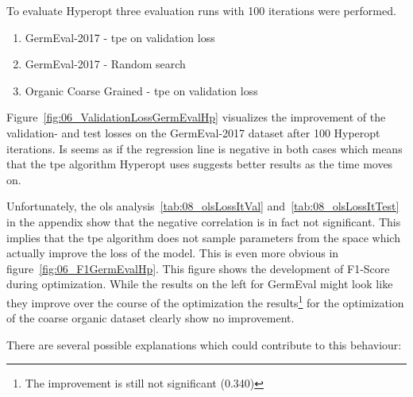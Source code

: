 To evaluate Hyperopt three evaluation runs with 100 iterations were performed.

\begin{enumerate}
	\item GermEval-2017 - \gls{tpe} on validation loss
	\item GermEval-2017 - Random search
	\item Organic Coarse Grained - \gls{tpe} on validation loss
\end{enumerate}

Figure~\ref{fig:06_ValidationLossGermEvalHp} visualizes the improvement of the validation- and test losses on the GermEval-2017 dataset after 100 Hyperopt iterations. Is seems as if the regression line is negative in both cases which means that the \gls{tpe} algorithm Hyperopt uses suggests better results as the time moves on.

Unfortunately, the \gls{ols} analysis~\ref{tab:08_olsLossItVal} and~\ref{tab:08_olsLossItTest} in the appendix show that the negative correlation is in fact not significant. This implies that the \gls{tpe} algorithm does not sample parameters from the space which actually improve the loss of the model. This is even more obvious in figure~\ref{fig:06_F1GermEvalHp}. This figure shows the development of F1-Score during optimization. While the results on the left for GermEval might look like they improve over the course of the optimization the results\footnote{The improvement is still not significant {(0.340)}} for the optimization of the coarse organic dataset clearly show no improvement.
\medskip

There are several possible explanations which could contribute to this behaviour:

